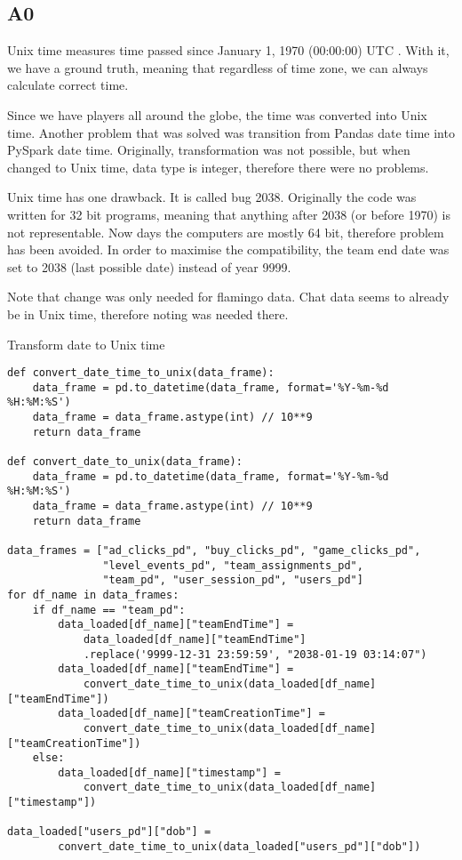 \subsection{A0}\label{A0}

Unix time measures time passed since January 1, 1970 (00:00:00) UTC \parencite{ritchie1978unix}. With it, we have a ground truth, meaning that regardless of time zone, we can always calculate correct time.

Since we have players all around the globe, the time was converted into Unix time. Another problem that was solved was transition from Pandas date time into PySpark date time. Originally, transformation was not possible, but when changed to Unix time, data type is integer, therefore there were no problems.

Unix time has one drawback. It is called bug 2038. Originally the code was written for 32 bit programs, meaning that anything after 2038 (or before 1970) is not representable. Now days the computers are mostly 64 bit, therefore problem has been avoided. In order to maximise the compatibility, the team end date was set to 2038 (last possible date) instead of year 9999.

Note that change was only needed for flamingo data. Chat data seems to already be in Unix time, therefore noting was needed there.

\begin{listing}[H]
\caption{Transform date to Unix time}
\begin{verbatim}
def convert_date_time_to_unix(data_frame):
    data_frame = pd.to_datetime(data_frame, format='%Y-%m-%d %H:%M:%S')
    data_frame = data_frame.astype(int) // 10**9
    return data_frame

def convert_date_to_unix(data_frame):
    data_frame = pd.to_datetime(data_frame, format='%Y-%m-%d %H:%M:%S')
    data_frame = data_frame.astype(int) // 10**9
    return data_frame

data_frames = ["ad_clicks_pd", "buy_clicks_pd", "game_clicks_pd", 
               "level_events_pd", "team_assignments_pd", 
               "team_pd", "user_session_pd", "users_pd"]
for df_name in data_frames:
    if df_name == "team_pd":
        data_loaded[df_name]["teamEndTime"] = 
            data_loaded[df_name]["teamEndTime"]
            .replace('9999-12-31 23:59:59', "2038-01-19 03:14:07")
        data_loaded[df_name]["teamEndTime"] = 
            convert_date_time_to_unix(data_loaded[df_name]["teamEndTime"])
        data_loaded[df_name]["teamCreationTime"] =
            convert_date_time_to_unix(data_loaded[df_name]["teamCreationTime"])
    else:
        data_loaded[df_name]["timestamp"] = 
            convert_date_time_to_unix(data_loaded[df_name]["timestamp"])
        
data_loaded["users_pd"]["dob"] = 
        convert_date_time_to_unix(data_loaded["users_pd"]["dob"])
\end{verbatim}
\end{listing}
